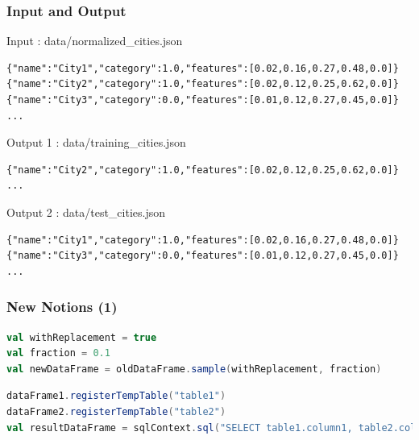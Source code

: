 \documentclass[slidetop,9pt,utf8]{beamer}
\begin{document}
\begin{frame}[fragile]

  \frametitle{Input and Output}
  
  \begin{block}{Input : data/normalized\_cities.json}
    \begin{verbatim}
{"name":"City1","category":1.0,"features":[0.02,0.16,0.27,0.48,0.0]}
{"name":"City2","category":1.0,"features":[0.02,0.12,0.25,0.62,0.0]}
{"name":"City3","category":0.0,"features":[0.01,0.12,0.27,0.45,0.0]}
...
    \end{verbatim}
  \end{block}

  \begin{block}{Output 1 : data/training\_cities.json}
    \begin{verbatim}
{"name":"City2","category":1.0,"features":[0.02,0.12,0.25,0.62,0.0]}
...
    \end{verbatim}
  \end{block}

  \begin{block}{Output 2 : data/test\_cities.json}
    \begin{verbatim}
{"name":"City1","category":1.0,"features":[0.02,0.16,0.27,0.48,0.0]}
{"name":"City3","category":0.0,"features":[0.01,0.12,0.27,0.45,0.0]}
...
    \end{verbatim}
  \end{block}

\end{frame}

\begin{frame}[fragile]
  \frametitle{New Notions (1)}

  \begin{lstlisting}[label=Sampling, caption=Sampling, language=scala, style=code]
val withReplacement = true
val fraction = 0.1
val newDataFrame = oldDataFrame.sample(withReplacement, fraction)
  \end{lstlisting}

  \begin{lstlisting}[label=SQLRequestOnTemporaryTables, caption=SQL Requests on Temporary Tables, language=scala, style=code]
dataFrame1.registerTempTable("table1")
dataFrame2.registerTempTable("table2")
val resultDataFrame = sqlContext.sql("SELECT table1.column1, table2.column1 FROM table1, table2")
  \end{lstlisting}

\end{frame}
\end{document}
